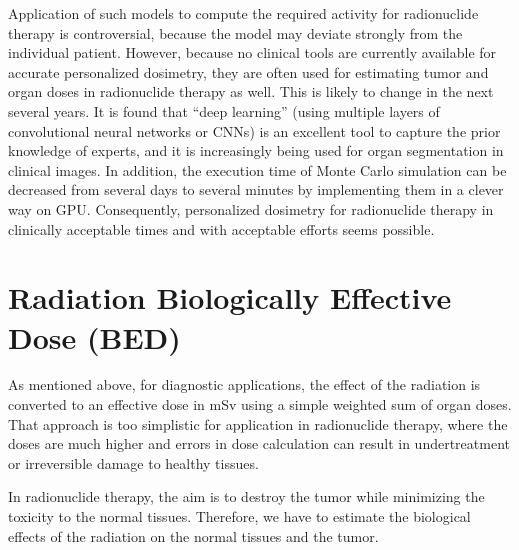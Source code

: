 Application of such models to compute the required activity for
radionuclide therapy is controversial, because the model may deviate
strongly from the individual patient. However, because no clinical
tools are currently available for accurate personalized dosimetry,
they are often used for estimating tumor and organ doses in
radionuclide therapy as well. This is likely to change in the next
several years. It is found that ``deep learning'' (using multiple
layers of convolutional neural networks or CNNs) is an excellent tool
to capture the prior knowledge of experts, and it is increasingly
being used for organ segmentation in clinical images. In addition, the
execution time of Monte Carlo simulation can be decreased from several
days to several minutes by implementing them in a clever way on
GPU. Consequently, personalized dosimetry for radionuclide therapy in
clinically acceptable times and with acceptable efforts seems
possible.

\section{Radiation Biologically Effective Dose (BED)}
As mentioned above, for diagnostic applications, the effect of the
radiation is converted to an effective dose in mSv using a simple
weighted sum of organ doses. That approach is too simplistic for
application in radionuclide therapy, where the doses are much higher
and errors in dose calculation can result in undertreatment or
irreversible damage to healthy tissues.

In radionuclide therapy, the aim is to destroy the tumor while
minimizing the toxicity to the normal tissues. Therefore, we have to
estimate the biological effects of the radiation on the normal tissues
and the tumor.

